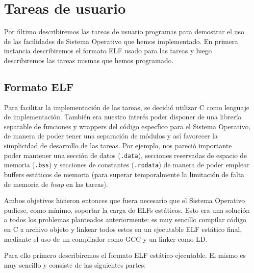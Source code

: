 \section{Tareas de usuario}
\label{sec::usertasks}

Por \'ultimo describiremos las tareas de usuario programas para demostrar el
uso de las facilidades de Sistema Operativo que hemos implementado. En primera instancia
describiremos el formato ELF usado para las tareas y luego describiremos las tareas mismas
que hemos programado.

\subsection{Formato ELF}

Para facilitar la implementaci\'on de las tareas, se decidi\'o utilizar C como lenguaje de
implementaci\'on. Tambi\'en era nuestro inter\'es poder disponer de una librer\'ia separable
de funciones y wrappers del c\'odigo espec\'fico para el Sistema Operativo, de manera de poder
tener una separaci\'on de m\'odulos y as\'i favorecer la simplicidad de desarrollo de las tareas.
Por ejemplo, nos pareci\'o importante poder mantener una secci\'on de datos (\texttt{.data}),
secciones reservadas de espacio de memoria (\texttt{.bss}) y secciones de constantes (\texttt{.rodata})
de manera de poder emplear buffers est\'aticos de memoria (para superar temporalmente la limitaci\'on de
falta de memoria de \textit{heap} en las tareas).

Ambos objetivos hicieron entonces que fuera necesario que el Sistema Operativo pudiese, como
m\'inimo, soportar la carga de ELFs est\'aticos. Esto era una soluci\'on a todos los problemas
planteados anteriormente: es muy sencillo compilar c\'odigo en C a archivo objeto y linkear todos
estos en un ejecutable ELF est\'atico final, mediante el uso de un compilador como GCC y un linker como
LD.

Para ello primero describiremos el formato ELF est\'atico ejecutable. El mismo es muy sencillo y consiste
de las siguientes partes:

